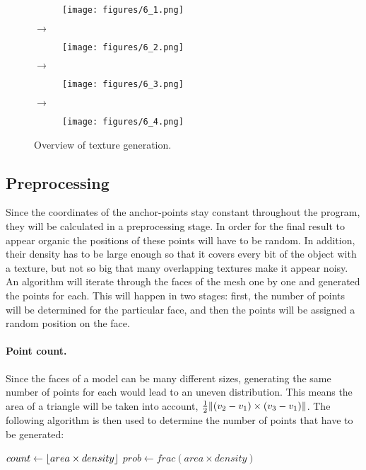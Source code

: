 \documentclass[a4paper, 12pt]{article}
\DeclarePairedDelimiter{\norm}{\lVert}{\rVert}
\DeclarePairedDelimiter{\floor}{\lfloor}{\rfloor}
\begin{document}
\begin{figure}
  \centering
  \begin{subfigure}{0.2\columnwidth}
    \texttt{[image: figures/6\_1.png]}
  \end{subfigure}%
  $\bm{\rightarrow}$%
  \begin{subfigure}{0.2\columnwidth}
    \texttt{[image: figures/6\_2.png]}
  \end{subfigure}%
  $\bm{\rightarrow}$%
  \begin{subfigure}{0.2\columnwidth}
    \texttt{[image: figures/6\_3.png]}
  \end{subfigure}%
  $\bm{\rightarrow}$%
  \begin{subfigure}{0.2\columnwidth}
    \texttt{[image: figures/6\_4.png]}
  \end{subfigure}
  \caption{Overview of texture generation.}
\end{figure}


\subsection{Preprocessing}
Since the coordinates of the anchor-points stay constant throughout the program, they will be calculated in a preprocessing stage. In order for the final result to appear organic the positions of these points will have to be random. In addition, their density has to be large enough so that it covers every bit of the object with a texture, but not so big that many overlapping textures make it appear noisy. An algorithm will iterate through the faces of the mesh one by one and generated the points for each. This will happen in two stages: first, the number of points will be determined for the particular face, and then the points will be assigned a random position on the face.

\paragraph{Point count.}
Since the faces of a model can be many different sizes, generating the same number of points for each would lead to an uneven distribution. This means the area of a triangle will be taken into account, $\frac{1}{2}\norm{(v_2-v_1) \times (v_3-v_1)}$. The following algorithm is then used to determine the number of points that have to be generated:

\begin{algorithm}[H]
$count \leftarrow \floor{area \times density}$\;
$prob \leftarrow frac(area \times density)$ 
\end{algorithm}
\end{document}
